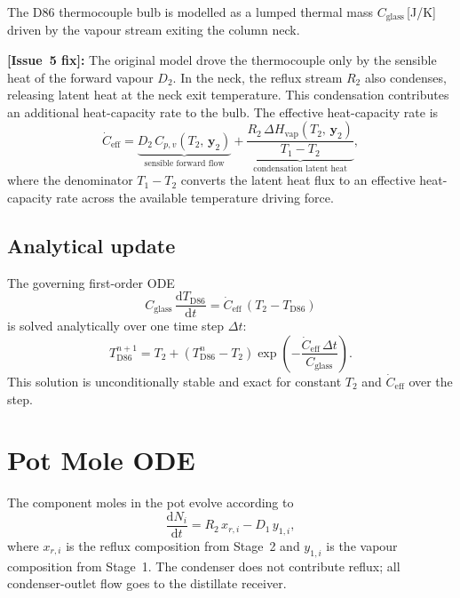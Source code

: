 \documentclass[11pt,letterpaper]{article}
\newcommand{\dd}{\mathrm{d}}
\newcommand{\dt}{\Delta t}
\begin{document}
The D86 thermocouple bulb is modelled as a lumped thermal mass $C_{\mathrm{glass}}$\,[J/K]
driven by the vapour stream exiting the column neck.

\textbf{[Issue~5 fix]:} The original model drove the thermocouple only by
the sensible heat of the forward vapour $D_2$.  In the neck, the reflux
stream $R_2$ also condenses, releasing latent heat at the neck exit temperature.
This condensation contributes an additional heat-capacity rate to the bulb.
The effective heat-capacity rate is
\begin{equation}
  \dot{C}_{\mathrm{eff}} = \underbrace{D_2\, C_{p,v}(T_2,\,\mathbf{y}_2)}_{\text{sensible forward flow}}
  + \underbrace{\frac{R_2\, \Delta H_{\mathrm{vap}}(T_2,\,\mathbf{y}_2)}{T_1 - T_2}}_{\text{condensation latent heat}},
  \label{eq:Cflow}
\end{equation}
where the denominator $T_1 - T_2$ converts the latent heat flux to an
effective heat-capacity rate across the available temperature driving force.

\subsection{Analytical update}

The governing first-order ODE
\begin{equation}
  C_{\mathrm{glass}}\,\frac{\dd T_{\mathrm{D86}}}{\dd t}
  = \dot{C}_{\mathrm{eff}}\,(T_2 - T_{\mathrm{D86}})
\end{equation}
is solved analytically over one time step $\dt$:
\begin{equation}
  T_{\mathrm{D86}}^{n+1}
  = T_2 + \left(T_{\mathrm{D86}}^{n} - T_2\right)
    \exp\!\left(-\frac{\dot{C}_{\mathrm{eff}}\,\dt}{C_{\mathrm{glass}}}\right).
  \label{eq:Td86update}
\end{equation}
This solution is unconditionally stable and exact for constant $T_2$ and
$\dot{C}_{\mathrm{eff}}$ over the step.

\section{Pot Mole ODE}
\label{sec:ode}

The component moles in the pot evolve according to
\begin{equation}
  \frac{\dd N_i}{\dd t} = R_2\, x_{r,i} - D_1\, y_{1,i},
  \label{eq:ode}
\end{equation}
where $x_{r,i}$ is the reflux composition from Stage~2 and $y_{1,i}$ is the
vapour composition from Stage~1.  The condenser does not contribute reflux;
all condenser-outlet flow goes to the distillate receiver.
\end{document}
